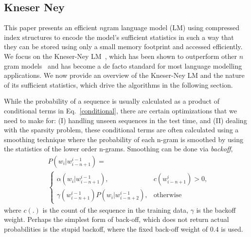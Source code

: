
\subsection{Kneser Ney}


This paper presents an efficient $n$gram language model (LM) using compressed index structures to encode the model's sufficient statistics in such a way that they can be stored using only a small memory footprint and accessed efficiently. 
We focus on the Kneser-Ney LM~\cite{kneser1995improved}, which has been shown to outperform other $n$gram models~\cite{chen1996empirical} and has become a de facto standard for most language modelling applications.
We now provide an overview of the Kneser-Ney LM and the nature of its sufficient statistics, which drive the algorithms in the following section.



While the probability of a sequence is usually calculated as a product of conditional terms in Eq.~\ref{conditional}, there are certain optimizations that we need to make for: (I) handling unseen sequences in the test time, and (II) dealing with the sparsity problem, these conditional terms are often calculated using a smoothing technique where the probability of each n-gram is smoothed by using the statistics of the lower order n-grams. Smoothing can be done via \emph{backoff}, 
\begin{align}
& P(w_{i}|w_{i-n+1}^{i-1}) =\\
& \begin{cases}
  \alpha(w_{i}|w_{i-n+1}^{i-1}), &  c(w_{i-n+1}^{i})>0, \\\nonumber
  \gamma(w_{i-n+1}^{i-1})P(w_{i}|w_{i-n+2}^{i-1}), & \text{otherwise}
\end{cases}
\end{align}
where $c(.)$ is the count of the sequence in the training data, $\gamma$ is the backoff weight. Perhaps the simplest form of back-off, which does not return actual probabilities is the stupid backoff, where the fixed back-off weight of $0.4$ is used. 

